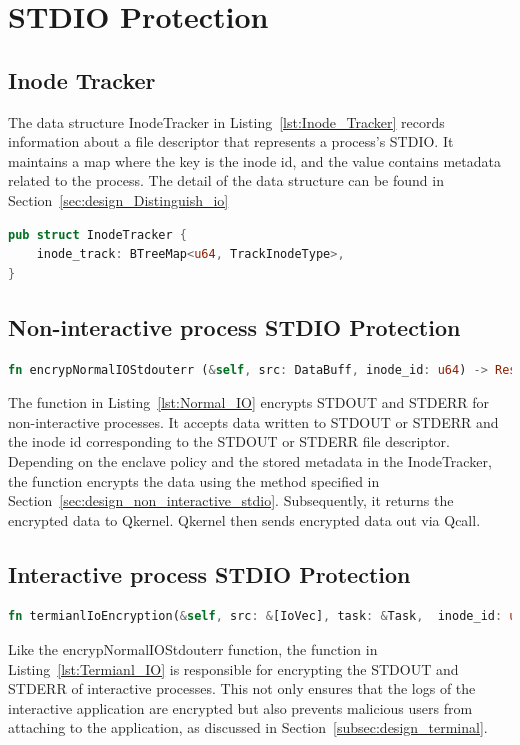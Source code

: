 \section{STDIO Protection}
\label{sec:impl_STDIO}

\subsection{Inode Tracker}
The data structure InodeTracker in Listing~\ref{lst:Inode_Tracker} records information about a file descriptor that represents a process’s STDIO. It maintains a map where the key is the inode id, and the value contains metadata related to the process. 
The detail of the data structure can be found in Section~\ref{sec:design_Distinguish_io}


\begin{lstlisting}[language=rust, caption= API of Inode Tracker, label={lst:Inode_Tracker}]
pub struct InodeTracker {
    inode_track: BTreeMap<u64, TrackInodeType>,
} 
\end{lstlisting}

\subsection{Non-interactive process STDIO Protection}
\begin{lstlisting}[language=rust, caption= API of normal IO shield, label={lst:Normal_IO}]
fn encrypNormalIOStdouterr (&self, src: DataBuff, inode_id: u64) -> Result<DataBuff>
\end{lstlisting}
The function in Listing~\ref{lst:Normal_IO} encrypts STDOUT and STDERR for non-interactive processes. It accepts data written to STDOUT or STDERR and the inode id corresponding to the STDOUT or STDERR file descriptor. Depending on the enclave policy and the stored metadata in the InodeTracker, 
the function encrypts the data using the method specified in Section~\ref{sec:design_non_interactive_stdio}. Subsequently, it returns the encrypted data to Qkernel. Qkernel then sends encrypted data out via Qcall.



\subsection{Interactive process STDIO Protection}
\begin{lstlisting}[language=rust, caption= API of system call interceptor, label={lst:Termianl_IO}]
fn termianlIoEncryption(&self, src: &[IoVec], task: &Task,  inode_id: u64) -> Result<(Vec::<IoVec>)
\end{lstlisting}
Like the encrypNormalIOStdouterr function, the function in Listing~\ref{lst:Termianl_IO} is responsible for encrypting the STDOUT and STDERR of interactive processes. This not only ensures that the logs of the interactive application are encrypted but also prevents malicious 
users from attaching to the application, as discussed in Section~\ref{subsec:design_terminal}.

